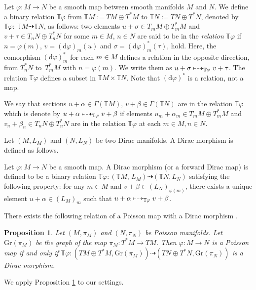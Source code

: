 \documentclass[pdftex]{sigma}
\numberwithin{equation}{section}
\newtheorem{Proposition}[Theorem]{Proposition}
 { \theoremstyle{definition}
\newtheorem{Definition}[Theorem]{Definition}
\newtheorem{Note}[Theorem]{Note}
\newtheorem{Example}[Theorem]{Example}
\newtheorem{Remark}[Theorem]{Remark}
\newtheorem{Question}[Theorem]{Question}
 }
\newcommand{\bbT}{{\mathbb{T}}}
\begin{document}
Let $\varphi\colon M\to N$ be a smooth map between smooth manifolds $M$ and $N$.
We define a binary relation $\mathbb{T}\varphi$ from $\mathbb{T}M:=TM\oplus T^*M$ to $\mathbb{T}N:=TN\oplus T^*N$, denoted by
$
\mathbb{T}\varphi \colon\ \mathbb{T}M \dashrightarrow \mathbb{T}N$,
as follows:
two elements $u+\sigma \in T_mM\oplus T_m^*M$ and $v+\tau \in T_nN\oplus T^*_nN$ for some $m\in M$, $n\in N$ are said to be in the \textit{relation} $\mathbb{T}\varphi$
if
$
n=\varphi(m)$, $ v=(\mathrm{d}\varphi)_m(u)$ and $ \sigma = (\mathrm{d}\varphi)_m^*(\tau)$,
hold. Here, the comorphism $(\mathrm{d}\varphi)_m^*$ for each $m\in M$ defines a relation in the opposite direction, from $T_n^*N$ to~$T_m^*M$ with $n=\varphi(m)$.
We write them as $u+\sigma\mapstochar\dashrightarrow_{\mathbb{T}\varphi} v+\tau$. The relation $\mathbb{T}\varphi$ defines a subset in $\mathbb{T}M\times \mathbb{T}N$.
Note that $(\mathrm{d}\varphi)^*$ is a relation, not a map.

We say that sections $u+\alpha \in \Gamma(\mathbb{T}M),\,v+\beta\in \Gamma(\mathbb{T}N)$ are in the relation $\mathbb{T}\varphi$ which is denote by
$u+\alpha\mapstochar\dashrightarrow_{\mathbb{T}\varphi} v+\beta$ if elements $u_m+\alpha_m\in T_mM\oplus T_m^*M$ and $v_n+\beta_n\in T_nN\oplus T_n^*N$ are in the relation $\mathbb{T}\varphi$ at each $m\in M, n\in N$.

Let $(M,L_M)$ and $(N,L_N)$ be two Dirac manifolds. A Dirac morphism is defined as follows.
\begin{Definition}
Let $\varphi\colon M\to N$ be a smooth map. A Dirac morphism {\rm (}or a forward Dirac map{\rm )} is defined to be a binary relation
$
\mathbb{T}\varphi \colon (\mathbb{T}M,\,L_M)\dashrightarrow (\mathbb{T}N, L_N)
$
satisfying the following property{\rm :} for any $m\in M$ and $v+\beta\in (L_N)_{\varphi(m)}$, there exists a unique element $u+\alpha\in (L_M)_m$ such that
$u+\alpha\mapstochar\dashrightarrow_{\mathbb{T}\varphi} v+\beta$.
\end{Definition}

There exists the following relation of a Poisson map
with a Dirac morphism \cite{Meinrenken02}.
\begin{Proposition}\label{PoissonDirac}
Let $(M, \pi_M)$ and $(N, \pi_N)$ be Poisson manifolds.
Let $\mathrm{Gr}(\pi_M)$ be the graph of the map
$\pi_M\colon T^*M \rightarrow TM$.
Then $\varphi\colon M \rightarrow N$ is a Poisson map if and only if
$\bbT \varphi\colon (TM \oplus T^*M, \mathrm{Gr}(\pi_M))
\dashrightarrow (TN \oplus T^*N, \mathrm{Gr}(\pi_N))$
is a Dirac morphism.
\end{Proposition}
We apply Proposition \ref{PoissonDirac} to our settings.
\end{document}
